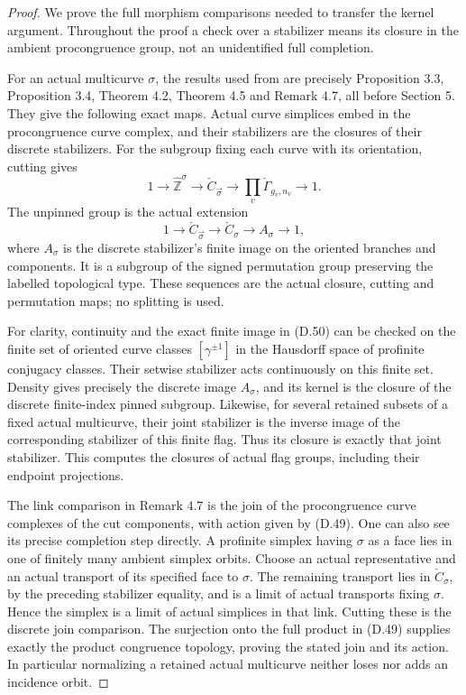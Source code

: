 \begin{proof}
We prove the full morphism comparisons needed to transfer
the kernel argument.  Throughout the proof a check over a
stabilizer means its closure in the ambient procongruence
group, not an unidentified full completion.

For an actual multicurve $\sigma$, the results used from
\cite{ET_Boggi2014} are precisely Proposition 3.3,
Proposition 3.4, Theorem 4.2, Theorem 4.5 and Remark 4.7,
all before Section 5.  They give the following exact maps.
Actual curve simplices embed in the procongruence curve
complex, and their stabilizers are the closures of their
discrete stabilizers.  For the subgroup fixing each curve
with its orientation, cutting gives
\[
 1\longrightarrow\widehat{\mathbb Z}^{\sigma}
 \longrightarrow\check C_{\vec\sigma}
 \longrightarrow\prod_v\check\Gamma_{g_v,n_v}
 \longrightarrow1.                                         \tag{D.49}
\]
The unpinned group is the actual extension
\[
 1\longrightarrow\check C_{\vec\sigma}
 \longrightarrow\check C_\sigma
 \longrightarrow A_\sigma\longrightarrow1,                 \tag{D.50}
\]
where $A_\sigma$ is the discrete stabilizer's finite image
on the oriented branches and components.  It is a subgroup
of the signed permutation group preserving the labelled
topological type.  These sequences are the actual closure,
cutting and permutation maps; no splitting is used.

For clarity, continuity and the exact finite image in
(D.50) can be checked on the finite set of oriented curve
classes $[\gamma^{\pm1}]$ in the Hausdorff space of profinite
conjugacy classes.  Their setwise stabilizer acts
continuously on this finite set.  Density gives precisely
the discrete image $A_\sigma$, and its kernel is the
closure of the discrete finite-index pinned subgroup.
Likewise, for several retained subsets of a fixed actual
multicurve, their joint stabilizer is the inverse image
of the corresponding stabilizer of this finite flag.
Thus its closure is exactly that joint stabilizer.
This computes the closures of actual flag groups,
including their endpoint projections.

The link comparison in Remark 4.7 is the join of the
procongruence curve complexes of the cut components,
with action given by (D.49).  One can also see its
precise completion step directly.  A profinite simplex
having $\sigma$ as a face lies in one of finitely many
ambient simplex orbits.  Choose an actual representative
and an actual transport of its specified face to
$\sigma$.  The remaining transport lies in
$\check C_\sigma$, by the preceding stabilizer equality,
and is a limit of actual transports fixing $\sigma$.
Hence the simplex is a limit of actual simplices in
that link.  Cutting these is the discrete join
comparison.  The surjection onto the full product in
(D.49) supplies exactly the product congruence topology,
proving the stated join and its action.  In particular
normalizing a retained actual multicurve neither loses
nor adds an incidence orbit.


\end{proof}

